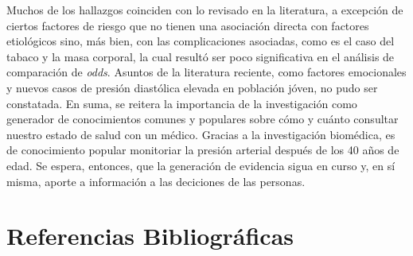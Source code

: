 \documentclass{aa}
\begin{document}
Muchos de los hallazgos coinciden con lo revisado en la literatura, a excepción de ciertos factores de riesgo que no tienen una asociación directa con factores etiológicos sino, más bien, con las complicaciones asociadas, como es el caso del tabaco y la masa corporal, la cual resultó ser poco significativa en el análisis de comparación de \textit{odds}. Asuntos de la literatura reciente, como factores emocionales y nuevos casos de presión diastólica elevada en población jóven, no pudo ser constatada. En suma, se reitera la importancia de la investigación como generador de conocimientos comunes y populares sobre cómo y cuánto consultar nuestro estado de salud con un médico. Gracias a la investigación biomédica, es de conocimiento popular monitoriar la presión arterial después de los 40 años de edad. Se espera, entonces, que la generación de evidencia sigua en curso y, en sí misma, aporte a información a las deciciones de las personas.




\section{Referencias Bibliográficas}
\end{document}
